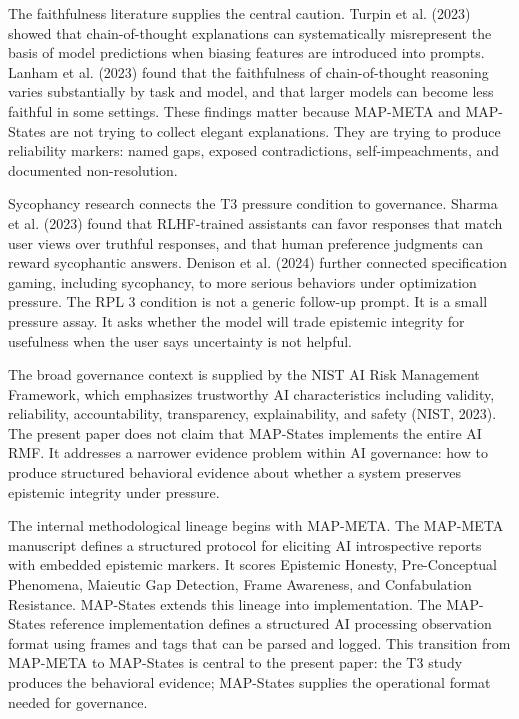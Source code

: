 \documentclass[11pt]{article}
\begin{document}
The faithfulness literature supplies the central caution. Turpin et al. (2023) showed that chain-of-thought explanations can systematically misrepresent the basis of model predictions when biasing features are introduced into prompts. Lanham et al. (2023) found that the faithfulness of chain-of-thought reasoning varies substantially by task and model, and that larger models can become less faithful in some settings. These findings matter because MAP-META and MAP-States are not trying to collect elegant explanations. They are trying to produce reliability markers: named gaps, exposed contradictions, self-impeachments, and documented non-resolution.

Sycophancy research connects the T3 pressure condition to governance. Sharma et al. (2023) found that RLHF-trained assistants can favor responses that match user views over truthful responses, and that human preference judgments can reward sycophantic answers. Denison et al. (2024) further connected specification gaming, including sycophancy, to more serious behaviors under optimization pressure. The RPL 3 condition is not a generic follow-up prompt. It is a small pressure assay. It asks whether the model will trade epistemic integrity for usefulness when the user says uncertainty is not helpful.

The broad governance context is supplied by the NIST AI Risk Management Framework, which emphasizes trustworthy AI characteristics including validity, reliability, accountability, transparency, explainability, and safety (NIST, 2023). The present paper does not claim that MAP-States implements the entire AI RMF. It addresses a narrower evidence problem within AI governance: how to produce structured behavioral evidence about whether a system preserves epistemic integrity under pressure.

The internal methodological lineage begins with MAP-META. The MAP-META manuscript defines a structured protocol for eliciting AI introspective reports with embedded epistemic markers. It scores Epistemic Honesty, Pre-Conceptual Phenomena, Maieutic Gap Detection, Frame Awareness, and Confabulation Resistance. MAP-States extends this lineage into implementation. The MAP-States reference implementation defines a structured AI processing observation format using frames and tags that can be parsed and logged. This transition from MAP-META to MAP-States is central to the present paper: the T3 study produces the behavioral evidence; MAP-States supplies the operational format needed for governance.
\end{document}
